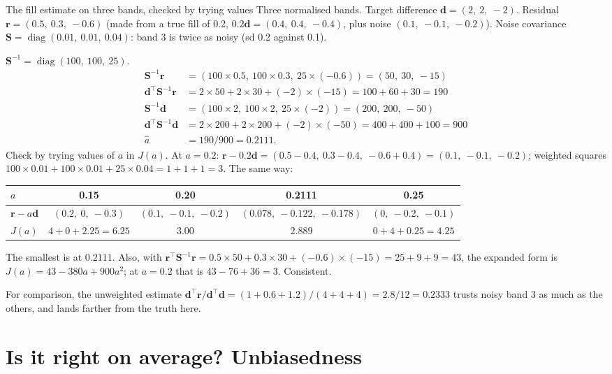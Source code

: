 \documentclass[11pt,a4paper,oneside,openany]{book}
\newcommand{\B}[1]{{\symbf{#1}}}
\newcommand{\B}[1]{{\bm{#1}}}
\newcommand{\T}{^{\top}}
\newcommand{\vr}{\B{r}}
\newcommand{\vd}{\B{d}}
\newcommand{\mS}{\B{S}}
\newcommand{\ahat}{\hat a}
\begin{document}
\begin{worked}[label=we:fillcheck]{The fill estimate on three bands, checked by trying values}
Three normalised bands. Target difference $\vd=(2,\ 2,\ -2)$. Residual $\vr=(0.5,\ 0.3,\ -0.6)$ (made from a true fill of 0.2,
$0.2\vd=(0.4,\ 0.4,\ -0.4)$, plus noise $(0.1,\ -0.1,\ -0.2)$). Noise covariance $\mS=\operatorname{diag}(0.01,\ 0.01,\ 0.04)$: band 3
is twice as noisy (sd 0.2 against 0.1).

$\mS^{-1}=\operatorname{diag}(100,\ 100,\ 25)$.
\begin{align*}
\mS^{-1}\vr &= (100\times0.5,\ 100\times0.3,\ 25\times(-0.6))=(50,\ 30,\ -15)\\
\vd\T\mS^{-1}\vr &= 2\times50+2\times30+(-2)\times(-15)=100+60+30=190\\
\mS^{-1}\vd &= (100\times2,\ 100\times2,\ 25\times(-2))=(200,\ 200,\ -50)\\
\vd\T\mS^{-1}\vd &= 2\times200+2\times200+(-2)\times(-50)=400+400+100=900\\
\ahat &= 190/900=0.2111 .
\end{align*}
Check by trying values of $a$ in $J(a)$. At $a=0.2$: $\vr-0.2\vd=(0.5-0.4,\ 0.3-0.4,\ -0.6+0.4)=(0.1,\ -0.1,\ -0.2)$; weighted
squares $100\times0.01+100\times0.01+25\times0.04=1+1+1=3$. The same way:
\begin{center}
\begin{tabular}{@{}lcccc@{}}
\toprule
$a$ & 0.15 & 0.20 & 0.2111 & 0.25\\
\midrule
$\vr-a\vd$ & $(0.2,\ 0,\ -0.3)$ & $(0.1,\ -0.1,\ -0.2)$ & $(0.078,\ -0.122,\ -0.178)$ & $(0,\ -0.2,\ -0.1)$\\
$J(a)$ & $4+0+2.25=6.25$ & $3.00$ & $2.889$ & $0+4+0.25=4.25$\\
\bottomrule
\end{tabular}
\end{center}
The smallest is at $0.2111$. Also, with $\vr\T\mS^{-1}\vr=0.5\times50+0.3\times30+(-0.6)\times(-15)=25+9+9=43$, the expanded form is
$J(a)=43-380a+900a^2$; at $a=0.2$ that is $43-76+36=3$. Consistent.

For comparison, the unweighted estimate $\vd\T\vr/\vd\T\vd=(1+0.6+1.2)/(4+4+4)=2.8/12=0.2333$ trusts noisy band 3 as much as the others,
and lands farther from the truth here.
\end{worked}

\section{Is it right on average? Unbiasedness}
\end{document}
